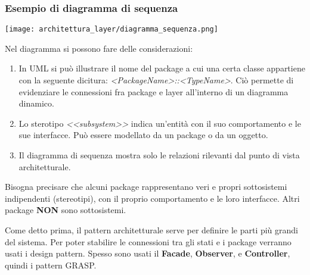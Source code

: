 {    \subsubsection{Esempio di diagramma di sequenza}
    \begin{center}
        \texttt{[image: architettura\_layer/diagramma\_sequenza.png]}
    \end{center}
    \newpage
    \noindent Nel diagramma si possono fare delle considerazioni:
    \begin{enumerate}
        \item In UML si può illustrare il nome del package a cui una certa classe appartiene con la seguente dicitura: \textit{<PackageName>::<TypeName>}.
              Ciò permette di evidenziare le connessioni fra package e layer all'interno di un diagramma dinamico.
        \item Lo sterotipo \textit{<<subsystem>>} indica un'entità con il suo comportamento e le sue interfacce. Può essere modellato da un package
              o da un oggetto.
        \item Il diagramma di sequenza mostra solo le relazioni rilevanti dal punto di vista architetturale.
    \end{enumerate}
    Bisogna precisare che alcuni package rappresentano veri e propri sottosistemi indipendenti (stereotipi),
    con il proprio comportamento e le loro interfacce. Altri package \textbf{NON} sono sottosistemi.

    Come detto prima, il pattern architetturale serve per definire le parti più grandi del sistema. Per poter stabilire le
    connessioni tra gli stati e i package verranno usati i design pattern. Spesso sono usati il \textbf{Facade}, \textbf{Observer},
    e \textbf{Controller}, quindi i pattern GRASP.

}
